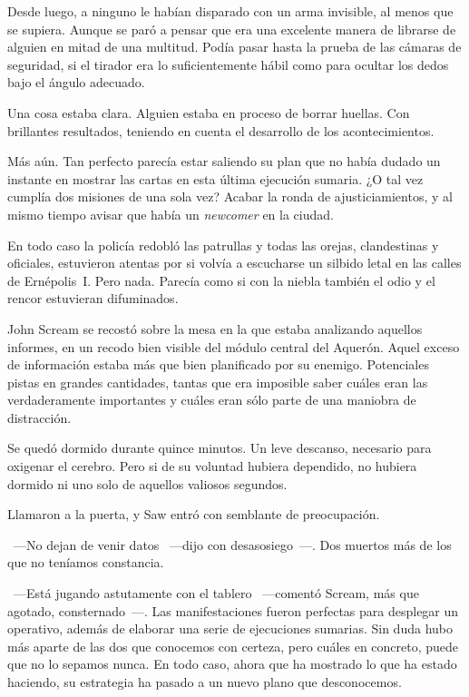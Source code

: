 Desde luego, a ninguno le habían disparado con un arma invisible, al menos que se supiera. Aunque se paró a pensar que era una excelente manera de librarse de alguien en mitad de una multitud. Podía pasar hasta la prueba de las cámaras de seguridad, si el tirador era lo suficientemente hábil como para ocultar los dedos bajo el ángulo adecuado.

Una cosa estaba clara. Alguien estaba en proceso de borrar huellas. Con brillantes resultados, teniendo en cuenta el desarrollo de los acontecimientos.

Más aún. Tan perfecto parecía estar saliendo su plan que no había dudado un instante en mostrar las cartas en esta última ejecución sumaria. ¿O tal vez cumplía dos misiones de una sola vez? Acabar la ronda de ajusticiamientos, y al mismo tiempo avisar que había un \emph{newcomer} en la ciudad.

En todo caso la policía redobló las patrullas y todas las orejas, clandestinas y oficiales, estuvieron atentas por si volvía a escucharse un silbido letal en las calles de Ernépolis~I. Pero nada. Parecía como si con la niebla también el odio y el rencor estuvieran difuminados.

John Scream se recostó sobre la mesa en la que estaba analizando aquellos informes, en un recodo bien visible del módulo central del Aquerón. Aquel exceso de información estaba más que bien planificado por su enemigo. Potenciales pistas en grandes cantidades, tantas que era imposible saber cuáles eran las verdaderamente importantes y cuáles eran sólo parte de una maniobra de distracción.

Se quedó dormido durante quince minutos. Un leve descanso, necesario para oxigenar el cerebro. Pero si de su voluntad hubiera dependido, no hubiera dormido ni uno solo de aquellos valiosos segundos.

Llamaron a la puerta, y Saw entró con semblante de preocupación.

~---No dejan de venir datos ~---dijo con desasosiego~---. Dos muertos más de los que no teníamos constancia.

~---Está jugando astutamente con el tablero ~---comentó Scream, más que agotado, consternado~---. Las manifestaciones fueron perfectas para desplegar un operativo, además de elaborar una serie de ejecuciones sumarias. Sin duda hubo más aparte de las dos que conocemos con certeza, pero cuáles en concreto, puede que no lo sepamos nunca. En todo caso, ahora que ha mostrado lo que ha estado haciendo, su estrategia ha pasado a un nuevo plano que desconocemos.

